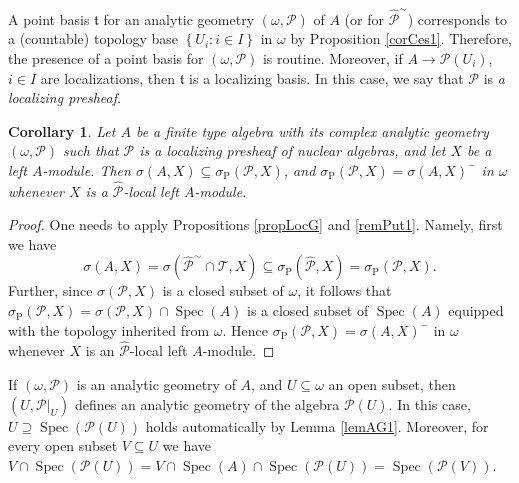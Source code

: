 \documentclass[12pt]{amsart}%
\theoremstyle{plain}
\newtheorem{corollary}{Corollary}
\numberwithin{equation}{section}
\numberwithin{equation}{section}
\numberwithin{theorem}{section}
\numberwithin{lemma}{section}
\numberwithin{remark}{section}
\numberwithin{example}{section}
\numberwithin{proposition}{section}
\numberwithin{definition}{section}
\numberwithin{corollary}{section}
\begin{document}
A point basis $\mathfrak{t}$ for an analytic geometry $\left(  \omega
,\mathcal{P}\right)  $ of $A$ (or for $\widehat{\mathcal{P}}^{\sim}$)
corresponds to a (countable) topology base $\left\{  U_{i}:i\in I\right\}  $
in $\omega$ by Proposition \ref{corCes1}. Therefore, the presence of a point
basis for $\left(  \omega,\mathcal{P}\right)  $ is routine. Moreover, if
$A\rightarrow\mathcal{P}\left(  U_{i}\right)  $, $i\in I$ are localizations,
then $\mathfrak{t}$ is a localizing basis. In this case, we say that
$\mathcal{P}$ is\textit{ a localizing presheaf}.

\begin{corollary}
\label{corM1}Let $A$ be a finite type algebra with its complex analytic
geometry $\left(  \omega,\mathcal{P}\right)  $ such that $\mathcal{P}$ is a
localizing presheaf of nuclear algebras, and let $X$ be a left $A$-module.
Then $\sigma\left(  A,X\right)  \subseteq\sigma_{\operatorname{P}}\left(
\mathcal{P},X\right)  $, and $\sigma_{\operatorname{P}}\left(  \mathcal{P}%
,X\right)  =\sigma\left(  A,X\right)  ^{-}$ in $\omega$ whenever $X$ is a
$\widehat{\mathcal{P}}$-local left $A$-module.
\end{corollary}

\begin{proof}
One needs to apply Propositions \ref{propLocG} and \ref{remPut1}. Namely,
first we have
\[
\sigma\left(  A,X\right)  =\sigma\left(  \widehat{\mathcal{P}}^{\sim}%
\cap\mathcal{T},X\right)  \subseteq\sigma_{\operatorname{P}}\left(
\widehat{\mathcal{P}},X\right)  =\sigma_{\operatorname{P}}\left(
\mathcal{P},X\right)  .
\]
Further, since $\sigma\left(  \mathcal{P},X\right)  $ is a closed subset of
$\omega$, it follows that $\sigma_{\operatorname{P}}\left(  \mathcal{P}%
,X\right)  =\sigma\left(  \mathcal{P},X\right)  \cap\operatorname{Spec}\left(
A\right)  $ is a closed subset of $\operatorname{Spec}\left(  A\right)  $
equipped with the topology inherited from $\omega$. Hence $\sigma
_{\operatorname{P}}\left(  \mathcal{P},X\right)  =\sigma\left(  A,X\right)
^{-}$ in $\omega$ whenever $X$ is an $\widehat{\mathcal{P}}$-local left $A$-module.
\end{proof}

If $\left(  \omega,\mathcal{P}\right)  $ is an analytic geometry of $A$, and
$U\subseteq\omega$ an open subset, then $\left(  U,\mathcal{P}|_{U}\right)  $
defines an analytic geometry of the algebra $\mathcal{P}\left(  U\right)  $.
In this case, $U\supseteq\operatorname{Spec}\left(  \mathcal{P}\left(
U\right)  \right)  $ holds automatically by Lemma \ref{lemAG1}. Moreover, for
every open subset $V\subseteq U$ we have $V\cap\operatorname{Spec}\left(
\mathcal{P}\left(  U\right)  \right)  =V\cap\operatorname{Spec}\left(
A\right)  \cap\operatorname{Spec}\left(  \mathcal{P}\left(  U\right)  \right)
=\operatorname{Spec}\left(  \mathcal{P}\left(  V\right)  \right)  $.
\end{document}
